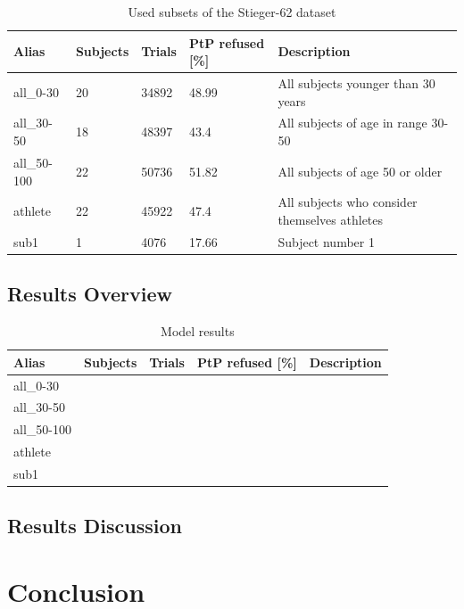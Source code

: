 \documentclass[english, he, bc, kiv, iso690alph, viewonly]{fasthesis}
\begin{document}
\begin{table}
	\label{tab:subsets}
	\centering
	\caption{Used subsets of the Stieger-62 dataset}
	\begin{tabular}{*{4}{l}p{}}
		\toprule
		\textbf{Alias} & \textbf{Subjects} & \textbf{Trials} & \textbf{PtP refused [\%]} & \textbf{Description} \\
		\midrule
		all\_0-30 & 20 & 34892 & 48.99 & All subjects younger than 30 years\\
		all\_30-50 & 18 & 48397 & 43.4 & All subjects of age in range 30-50\\
		all\_50-100 & 22 & 50736 & 51.82 & All subjects of age 50 or older\\
		athlete & 22 & 45922 & 47.4 & All subjects who consider themselves athletes\\
		sub1 & 1 & 4076 & 17.66 & Subject number 1\\
		\bottomrule
	\end{tabular}
\end{table}

\section{Results Overview}

\begin{table}
	\label{tab:results}
	\centering
	\caption[Model results]{Model results}
	\begin{tabular}{*{5}{l}}
		\toprule
		\textbf{Alias} & \textbf{Subjects} & \textbf{Trials} & \textbf{PtP refused [\%]} & \textbf{Description} \\
		\midrule
		all\_0-30\\
		all\_30-50\\
		all\_50-100\\
		athlete\\
		sub1\\
		\bottomrule
	\end{tabular}
\end{table}

\section{Results Discussion}
\label{sec:disc}

\chapter{Conclusion}
\label{chap:conclusion}


\backmatter
\printbibliography
\listoffigures
\listoftables
\listoflistings

\setbackpageqrcode
\backpage
\end{document}
